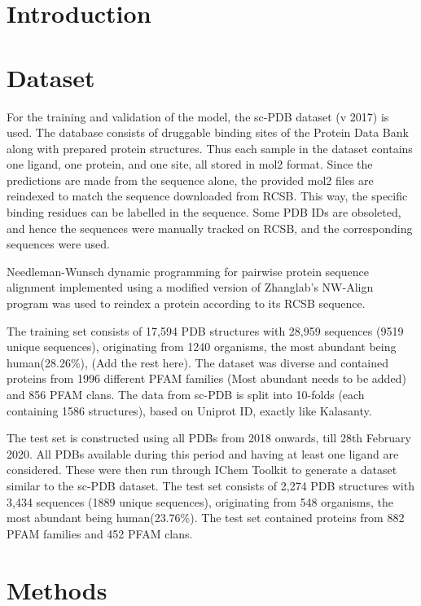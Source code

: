 \documentclass[journal=jacsat,manuscript=article]{achemso}
\begin{document}
\section{Introduction}


\section{Dataset}
For the training and validation of the model, the sc-PDB\cite{desaphy2015sc} dataset (v 2017) is used. The database consists of druggable binding sites of the Protein Data Bank along with prepared protein structures. Thus each sample in the dataset contains one ligand, one protein, and one site, all stored in mol2 format. Since the predictions are made from the sequence alone, the provided mol2 files are reindexed to match the sequence downloaded from RCSB. This way, the specific binding residues can be labelled in the sequence. Some PDB IDs are obsoleted, and hence the sequences were manually tracked on RCSB, and the corresponding sequences were used.

Needleman-Wunsch dynamic programming for pairwise protein sequence alignment implemented using a modified version of Zhanglab's NW-Align program\cite{NWAlign} was used to reindex a protein according to its RCSB sequence.

The training set consists of 17,594 PDB structures with 28,959 sequences (9519 unique sequences), originating from 1240 organisms, the most abundant being human(28.26\%), (Add the rest here). The dataset was diverse and contained proteins from 1996 different PFAM families (Most abundant needs to be added) and 856 PFAM clans. The data from sc-PDB is split into 10-folds (each containing 1586 structures), based on Uniprot ID, exactly like Kalasanty\cite{stepniewska2020improving}.

The test set is constructed using all PDBs from 2018 onwards, till 28th February 2020. All PDBs available during this period and having at least one ligand are considered. These were then run through IChem Toolkit \cite{da2018ichem} to generate a dataset similar to the sc-PDB dataset. The test set consists of 2,274 PDB structures with 3,434 sequences (1889 unique sequences), originating from 548 organisms, the most abundant being human(23.76\%). The test set contained proteins from 882 PFAM families and 452 PFAM clans.


\section{Methods}
\end{document}
